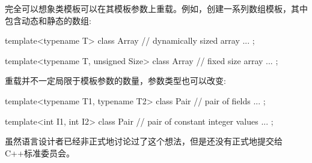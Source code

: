 完全可以想象类模板可以在其模板参数上重载。例如，创建一系列数组模板，其中包含动态和静态的数组:

\begin{cpp}
template<typename T>
class Array {
	// dynamically sized array
	...
};

template<typename T, unsigned Size>
class Array {
	// fixed size array
	...
};
\end{cpp}

重载并不一定局限于模板参数的数量，参数类型也可以改变:

\begin{cpp}
template<typename T1, typename T2>
class Pair {
	// pair of fields
	...
};

template<int I1, int I2>
class Pair {
	// pair of constant integer values
	...
};
\end{cpp}

虽然语言设计者已经非正式地讨论过了这个想法，但是还没有正式地提交给C++标准委员会。











































